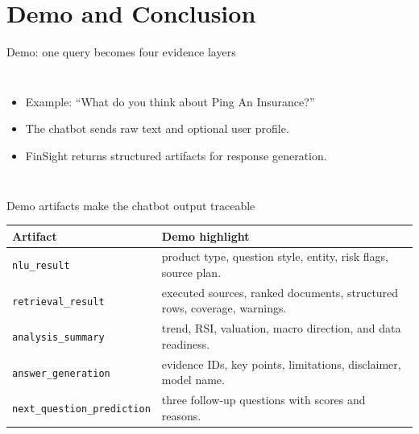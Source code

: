 \documentclass[10pt]{beamer}
\begin{document}
\section{Demo and Conclusion}

\begin{frame}{Demo: one query becomes four evidence layers}
  \begin{columns}[T,onlytextwidth]
      \begin{itemize}
        \item Example: ``What do you think about Ping An Insurance?''
        \item The chatbot sends raw text and optional user profile.
        \item FinSight returns structured artifacts for response generation.
      \end{itemize}
  \end{columns}
\end{frame}

\begin{frame}{Demo artifacts make the chatbot output traceable}
  \begin{tabularx}{\textwidth}{lX}
    \toprule
    Artifact & Demo highlight \\
    \midrule
    \texttt{nlu\_result} & product type, question style, entity, risk flags, source plan. \\
    \texttt{retrieval\_result} & executed sources, ranked documents, structured rows, coverage, warnings. \\
    \texttt{analysis\_summary} & trend, RSI, valuation, macro direction, and data readiness. \\
    \texttt{answer\_generation} & evidence IDs, key points, limitations, disclaimer, model name. \\
    \texttt{next\_question\_prediction} & three follow-up questions with scores and reasons. \\
    \bottomrule
  \end{tabularx}
\end{frame}
\end{document}
